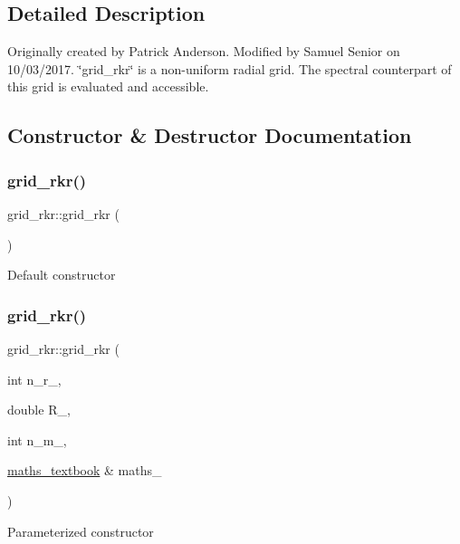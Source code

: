 \subsection{Detailed Description}
Originally created by Patrick Anderson. Modified by Samuel Senior on 10/03/2017. \char`\"{}grid\+\_\+rkr\char`\"{} is a non-\/uniform radial grid. The spectral counterpart of this grid is evaluated and accessible. 

\subsection{Constructor \& Destructor Documentation}
\mbox{\label{classgrid__rkr_a8c3f61553704783780b89fb19aeb400c}} 
\subsubsection{\texorpdfstring{grid\_rkr()}{grid\_rkr()}\hspace{0.1cm}{\footnotesize\ttfamily [1/2]}}
{\footnotesize\ttfamily grid\+\_\+rkr\+::grid\+\_\+rkr (\begin{DoxyParamCaption}{ }\end{DoxyParamCaption})}

Default constructor \mbox{\label{classgrid__rkr_adc3dbfbeb1dcc1ac948b58d26a83ffd1}} 
\subsubsection{\texorpdfstring{grid\_rkr()}{grid\_rkr()}\hspace{0.1cm}{\footnotesize\ttfamily [2/2]}}
{\footnotesize\ttfamily grid\+\_\+rkr\+::grid\+\_\+rkr (\begin{DoxyParamCaption}\item[{int}]{n\+\_\+r\+\_\+,  }\item[{double}]{R\+\_\+,  }\item[{int}]{n\+\_\+m\+\_\+,  }\item[{\mbox{\hyperlink{classmaths__textbook}{maths\+\_\+textbook}} \&}]{maths\+\_\+ }\end{DoxyParamCaption})}

Parameterized constructor 

